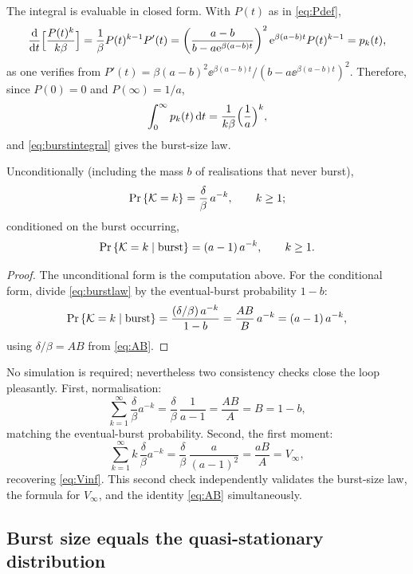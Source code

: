 The integral is evaluable in closed form. With $P(t)$ as in \eqref{eq:Pdef},
\begin{equation}
\frac{{\rm d}}{{\rm d} t}\Bigl[\frac{P(t)^k}{k\beta}\Bigr]
=\frac{1}{\beta}P(t)^{k-1}P'(t)
=\left(\frac{a-b}{b-a{\rm e}^{\beta(a-b)t}}\right)^2
{\rm e}^{\beta(a-b)t}P(t)^{k-1}
=p_k(t),
\label{eq:antideriv}
\end{equation}
as one verifies from
$P'(t)=\beta(a-b)^2\ee^{\beta(a-b)t}/(b-a\ee^{\beta(a-b)t})^2$.
Therefore, since $P(0)=0$ and $P(\infty)=1/a$,
\begin{equation}
\int_0^\infty p_k(t)\,{\rm d} t=\frac{1}{k\beta}\Bigl(\frac{1}{a}\Bigr)^k,
\end{equation}
and \eqref{eq:burstintegral} gives the burst-size law.

\begin{theorem}
\label{thm:burst}
Unconditionally (including the mass $b$ of realisations that never burst),
\begin{equation}
{\text{Pr}\left\{\mathcal{K}=k\right\}}=\frac{\delta}{\beta}\,a^{-k},\qquad k\ge1;
\label{eq:burstlaw}
\end{equation}
conditioned on the burst occurring,
\begin{equation}
{\text{Pr}\left\{\mathcal{K}=k\mid\text{burst}\right\}}=(a-1)\,a^{-k},\qquad k\ge1.
\label{eq:burstlaw-cond}
\end{equation}
\end{theorem}

\begin{proof}
The unconditional form is the computation above. For the conditional form,
divide \eqref{eq:burstlaw} by the eventual-burst probability $1-b$:
$$
{\text{Pr}\left\{\mathcal{K}=k\mid\text{burst}\right\}}
=\frac{(\delta/\beta)\,a^{-k}}{1-b}
=\frac{AB}{B}\,a^{-k}
=(a-1)\,a^{-k},
$$
using $\delta/\beta=AB$ from \eqref{eq:AB}.
\end{proof}

No simulation is required; nevertheless two consistency checks close the
loop pleasantly. First, normalisation:
$$
\sum_{k=1}^{\infty}\frac{\delta}{\beta}a^{-k}
=\frac{\delta}{\beta}\,\frac{1}{a-1}
=\frac{AB}{A}=B=1-b,
$$
matching the eventual-burst probability. Second, the first moment:
$$
\sum_{k=1}^{\infty}k\,\frac{\delta}{\beta}a^{-k}
=\frac{\delta}{\beta}\,\frac{a}{(a-1)^2}
=\frac{aB}{A}=V_\infty,
$$
recovering \eqref{eq:Vinf}. This second check independently validates the
burst-size law, the formula for $V_\infty$, and the identity
\eqref{eq:AB} simultaneously.

\subsection{Burst size equals the quasi-stationary distribution}
\label{sec:burst=qsd}

